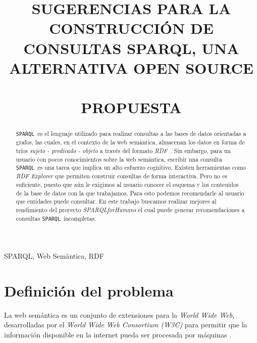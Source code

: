 \documentclass[conference,compsoc]{IEEEtran}
\newcommand{\rdf}{\textit{RDF}\ }
\newcommand{\spql}{\texttt{SPARQL}\ }
\begin{document}
\title{SUGERENCIAS PARA LA CONSTRUCCIÓN DE CONSULTAS SPARQL, UNA ALTERNATIVA OPEN SOURCE\\ \ \\PROPUESTA}

\author{
}

\maketitle

\IEEEpubidadjcol

\begin{abstract}
    \spql es el lenguaje utilizado para realizar consultas a las bases de datos orientadas
    a grafos, las cuales, en el contexto de la web semántica, almacenan los datos en forma
    de tríos \textit{sujeto - predicado - objeto} a través del formato \rdf. Sin embargo,
    para un usuario con pocos conocimientos sobre la web semántica, escribir una consulta
    \spql es una tarea que implica un alto esfuerzo cognitivo. Existen herramientas como
    \textit{RDF Explorer} que permiten construir consultas de forma interactiva. Pero no es
    suficiente, puesto que aún le exigimos al usuario conocer el esquema y los contenidos
    de la base de datos con la que trabajamos. Para esto podemos recomendarle al usuario que entidades
    puede consultar. En este trabajo buscamos realizar mejores al rendimiento del proyecto
    \textit{SPARQLforHumans} el cual puede generar recomendaciones a consultas \spql incompletas.
\end{abstract}

\begin{IEEEkeywords}
    SPARQL, Web Semántica, RDF
\end{IEEEkeywords}

\IEEEpeerreviewmaketitle

\section{Definición del problema}

La web semántica es un conjunto de extensiones para la \textit{World Wide Web},
desarrolladas por el \textit{World Wide Web Consortium (W3C)} para permitir que
la información disponible en la internet pueda ser procesada por máquinas \cite{berners2001semantic}.
\end{document}

